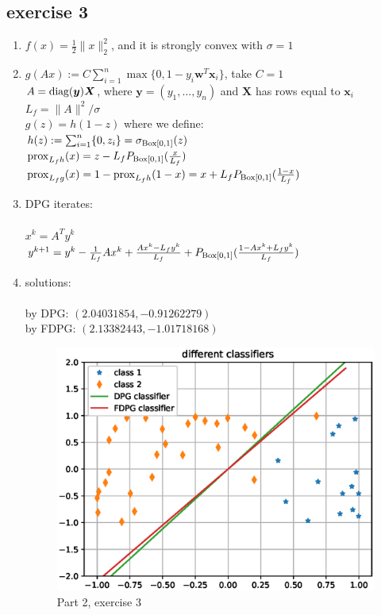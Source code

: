 \subsection{exercise 3}
\begin{enumerate}
    \item $f(x)=\frac{1}{2}\|x\|_2^2$, and it is strongly convex with $\sigma=1$
    \item $g(A x) := C \sum_{i=1}^n{\max\{0,1-y_i \bm w^T \bm x_i\}}$, take $C=1$\\
    $A = \operatorname{diag}(\bm y) \bm X$, where $\bm y=(y_1,\dots,y_n)$ and $\bm X$ has rows equal to $\bm x_i$\\
    $L_f = \|A\|^2/\sigma$\\
    $g(z) = h(1-z)$ where we define:\\
    $h(z) := \sum_{i=1}^n \{0, z_i\} = \sigma_{\operatorname{Box}[0,1]}(z)$\\
    $\operatorname{prox}_{L_f h}(x)=z-L_f P_{\operatorname{Box}[0,1]}(\frac{x}{L_f})$\\
    $\operatorname{prox}_{L_f g}(x) = 1 - \operatorname{prox}_{L_f h}(1 - x) = x + L_f P_{\operatorname{Box}[0,1]}(\frac{1-x}{L_f})$

    \item DPG iterates:\\\\
    $x^k = A^T y^k$\\
    $y^{k+1}=y^k - \frac{1}{L_f}A x^k + \frac{A x^k - L_f y^k}{L_f} + P_{\operatorname{Box}[0,1]}(\frac{1-A x^k + L_f y^k}{L_f})$

    \item solutions:\\\\
    by DPG: $(2.04031854, -0.91262279)$\\
    by FDPG: $(2.13382443, -1.01718168)$

    \begin{figure}[h]
        \centering
        \includegraphics[scale=0.5]{codes/result_images/ex_p2_e3_results.eps}
        \caption{Part 2, exercise 3}
        \label{fig:p2e3}
    \end{figure}

    
\end{enumerate}
